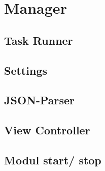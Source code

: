 \section{Manager}



\subsection{Task Runner}

\subsection{Settings}

\subsection{JSON-Parser}





\subsection{View Controller}

\subsection{Modul start/ stop}